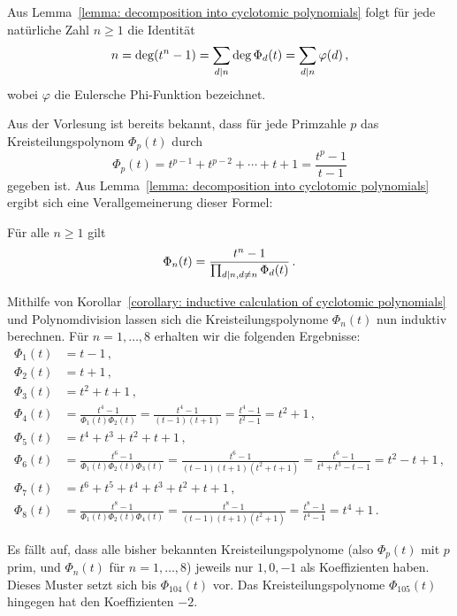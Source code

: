 \begin{remark}
  Aus Lemma~\ref{lemma: decomposition into cyclotomic polynomials} folgt für jede natürliche Zahl $n \geq 1$ die Identität
  \[
      n
    = \deg(t^n - 1)
    = \sum_{d \mathrel{|} n} \deg \Phi_d(t)
    = \sum_{d \mathrel{|} n} \varphi(d) \,,
  \]
  wobei $\varphi$ die Eulersche Phi-Funktion bezeichnet.
\end{remark}

Aus der Vorlesung ist bereits bekannt, dass für jede Primzahle $p$ das Kreisteilungspolynom $\Phi_p(t)$ durch
\[
    \Phi_p(t)
  = t^{p-1} + t^{p-2} + \dotsb + t + 1
  = \frac{t^p - 1}{t-1}
\]
gegeben ist.
Aus Lemma~\ref{lemma: decomposition into cyclotomic polynomials} ergibt sich eine Verallgemeinerung dieser Formel:

\begin{corollary}
  \label{corollary: inductive calculation of cyclotomic polynomials}
  Für alle $n \geq 1$ gilt
  \[
      \Phi_n(t)
    = \frac{t^n - 1}{\prod_{d \mathrel{|} n, d \neq n} \Phi_d(t)} \,.
  \]
\end{corollary}

Mithilfe von Korollar~\ref{corollary: inductive calculation of cyclotomic polynomials} und Polynomdivision lassen sich die Kreisteilungspolynome $\Phi_n(t)$ nun induktiv berechnen.
Für $n = 1, \dotsc, 8$ erhalten wir die folgenden Ergebnisse:
\begin{align*}
      \Phi_1(t)
  &=  t-1 \,,
  \\
      \Phi_2(t)
  &=  t+1 \,,
  \\
      \Phi_3(t)
  &=  t^2 + t + 1 \,,
  \\
      \Phi_4(t)
  &=  \frac{t^4 - 1}{\Phi_1(t) \Phi_2(t)}
   =  \frac{t^4 - 1}{(t-1)(t+1)}
   =  \frac{t^4 - 1}{t^2 - 1}
   =  t^2 + 1 \,,
  \\
      \Phi_5(t)
  &=  t^4 + t^3 + t^2 + t + 1 \,,
  \\
      \Phi_6(t)
  &=  \frac{t^6 - 1}{\Phi_1(t) \Phi_2(t) \Phi_3(t)}
   =  \frac{t^6 - 1}{(t-1)(t+1)(t^2 + t + 1)}
   =  \frac{t^6 - 1}{t^4 + t^3 - t - 1}
   =  t^2 - t + 1 \,,
  \\
      \Phi_7(t)
  &=  t^6 + t^5 + t^4 + t^3 + t^2 + t + 1 \,,
  \\
      \Phi_8(t)
  &=  \frac{t^8 - 1}{\Phi_1(t) \Phi_2(t) \Phi_4(t)}
   =  \frac{t^8 - 1}{(t-1)(t+1)(t^2 + 1)}
   =  \frac{t^8 - 1}{t^4 - 1}
   =  t^4 +1 \,.
\end{align*}

\begin{remark}
  Es fällt auf, dass alle bisher bekannten Kreisteilungspolynome (also $\Phi_p(t)$ mit $p$ prim, und $\Phi_n(t)$ für $n = 1, \dotsc, 8$) jeweils nur $1, 0, -1$ als Koeffizienten haben.
  Dieses Muster setzt sich bis $\Phi_{104}(t)$ vor.
  Das Kreisteilungspolynome $\Phi_{105}(t)$ hingegen hat den Koeffizienten $-2$.
\end{remark}





